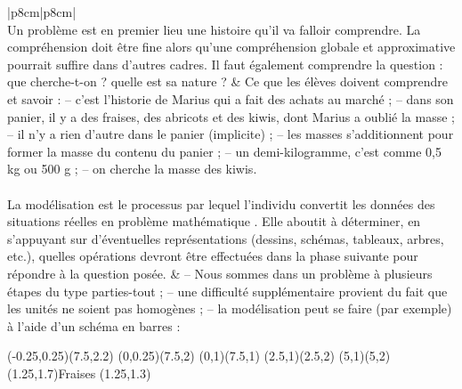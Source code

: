 {
\begin{longtable}{|p{8cm}|p{8cm}|}
   \hline
    \\
   \hline
   Un problème est en premier lieu une histoire qu’il va falloir comprendre. \newline
   La compréhension doit être fine alors qu'une compréhension globale et approximative pourrait suffire dans d'autres cadres. \newline
   Il faut également comprendre la question : que cherche-t-on ? quelle est sa nature ?
   &
   Ce que les élèves doivent comprendre et savoir  : \newline
   -- c'est l'historie de Marius qui a fait des achats au marché ; \newline
   -- dans son panier, il y a des fraises, des abricots et des kiwis, dont Marius a oublié la masse ; \newline
   -- il n’y a rien d’autre dans le panier (implicite) ; \newline
   -- les masses s’additionnent pour former la masse du contenu du panier ; \newline
   --  un demi-kilogramme, c'est comme 0,5 kg ou 500 g ; \newline
   -- on cherche la masse des kiwis. \\
   \hline \pagebreak
   \hline
    \\
   \hline
   La modélisation est le \og processus par lequel l’individu convertit les données des situations réelles en problème mathématique \fg. \newline
   Elle aboutit à déterminer, en s’appuyant sur d’éventuelles représentations (dessins, schémas, tableaux, arbres, etc.), quelles opérations devront être effectuées dans la phase suivante pour répondre à la question posée.
   &
   -- Nous sommes dans un problème à plusieurs étapes du type \og parties-tout \fg ; \newline
   -- une difficulté supplémentaire provient du fait que les unités ne soient pas homogènes ; \newline
   -- la modélisation peut se faire (par exemple) à l'aide d'un schéma en barres : \newline
   \begin{pspicture}(-0.25,0.25)(7.5,2.2)
      \psframe(0,0.25)(7.5,2)
      \psline(0,1)(7.5,1)
      \psline(2.5,1)(2.5,2)
      \psline(5,1)(5,2)
      \rput(1.25,1.7){Fraises}
      \rput(1.25,1.3){}

\end{pspicture}
\end{longtable}}

